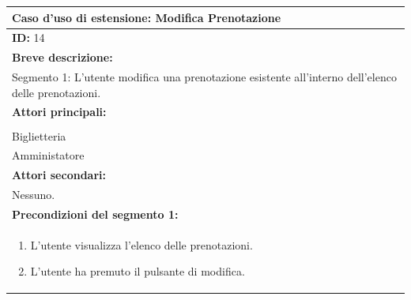 \documentclass{article}
\begin{document}
                \begin{table}[H]
                    \begin{tabular}{|p{\linewidth}|}
                        \hline
                        \cellcolor{gray!100}
                        \color{white}
                        \centerline{\textbf{Caso d'uso di estensione:} Modifica Prenotazione} \\
                        \hline
                        \textbf{ID:} 14 \\
                        \hline
                        \cellcolor{gray!20}
                        \textbf{Breve descrizione:} \\
                        \cellcolor{gray!20}
                        Segmento 1: L'utente modifica una prenotazione esistente all'interno dell'elenco delle prenotazioni. \\
                        \hline
                        \textbf{Attori principali:} \\
                        \begin{minipage}{\linewidth}
                            Cliente \\
                            Biglietteria \\
                            Amministatore
                        \end{minipage}
                        \vspace{0pt} \\
                        \hline
                        \textbf{Attori secondari:} \\                        
                        Nessuno. \\
                        \hline
                        \cellcolor{gray!20}
                        \textbf{Precondizioni del segmento 1:} \\
                        \cellcolor{gray!20}
                        \begin{minipage}{\linewidth}
                            \begin{enumerate}
                                \item L'utente visualizza l'elenco delle prenotazioni.
                                \item L'utente ha premuto il pulsante di modifica.
                            \end{enumerate}
                        \end{minipage}

\end{tabular}
\end{table}
\end{document}
